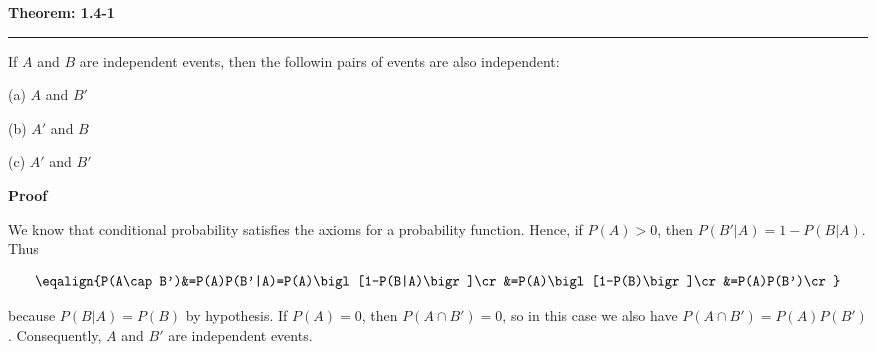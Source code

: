 \nopagenumbers
{\bf Theorem: 1.4-1}
\vskip 1mm
\hrule

\vskip 6pt
If $A$ and $B$ are independent events, then the followin pairs of events are also independent:

\vskip 6pt
(a) $A$ and $B'$

\vskip 6pt
(b) $A'$ and $B$

\vskip 6pt
(c) $A'$ and $B'$

\vskip 10pt
{\bf Proof}

\vskip 6pt
We know that conditional probability satisfies the axioms for a probability function. Hence, if $P(A)>0$, then $P(B'|A)=1-P(B|A)$. Thus

$$\eqalign{P(A\cap B')&=P(A)P(B'|A)=P(A)\bigl[1-P(B|A)\bigr]\cr
		&=P(A)\bigl[1-P(B)\bigr]\cr
		&=P(A)P(B')\cr}$$

because $P(B|A)=P(B)$ by hypothesis. If $P(A)=0$, then $P(A\cap B')=0$, so in this case we also have $P(A\cap B')=P(A)P(B')$. Consequently, $A$ and $B'$ are independent events.

\vfill\eject
\bye
